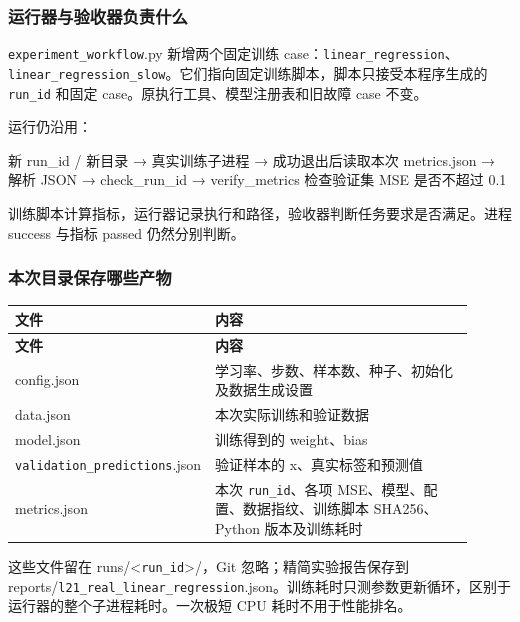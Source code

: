 \subsubsection{运行器与验收器负责什么}

\nolinkurl{experiment_workflow}.py 新增两个固定训练 case：\nolinkurl{linear_regression}、\nolinkurl{linear_regression_slow}。它们指向固定训练脚本，脚本只接受本程序生成的 \nolinkurl{run_id} 和固定 case。原执行工具、模型注册表和旧故障 case 不变。

运行仍沿用：

\begin{Code}
新 run_id / 新目录
  → 真实训练子进程
  → 成功退出后读取本次 metrics.json
  → 解析 JSON
  → check_run_id
  → verify_metrics 检查验证集 MSE 是否不超过 0.1
\end{Code}

训练脚本计算指标，运行器记录执行和路径，验收器判断任务要求是否满足。进程 success 与指标 passed 仍然分别判断。

\subsubsection{本次目录保存哪些产物}

{\small\setlength{\tabcolsep}{4pt}
\renewcommand{\arraystretch}{1.25}
\begin{longtable}{>{\raggedright\arraybackslash}p{0.28\linewidth}>{\raggedright\arraybackslash}p{0.63\linewidth}}
\toprule
\textbf{文件} & \textbf{内容} \\
\midrule\endfirsthead
\toprule
\textbf{文件} & \textbf{内容} \\
\midrule\endhead
\bottomrule\endfoot
config.json & 学习率、步数、样本数、种子、初始化及数据生成设置 \\
data.json & 本次实际训练和验证数据 \\
model.json & 训练得到的 weight、bias \\
\nolinkurl{validation_predictions}.json & 验证样本的 x、真实标签和预测值 \\
metrics.json & 本次 \nolinkurl{run_id}、各项 MSE、模型、配置、数据指纹、训练脚本 SHA256、Python 版本及训练耗时 \\
\end{longtable}}

这些文件留在 runs/<\nolinkurl{run_id}>/，Git 忽略；精简实验报告保存到 reports/\nolinkurl{l21_real_linear_regression}.json。训练耗时只测参数更新循环，区别于运行器的整个子进程耗时。一次极短 CPU 耗时不用于性能排名。

